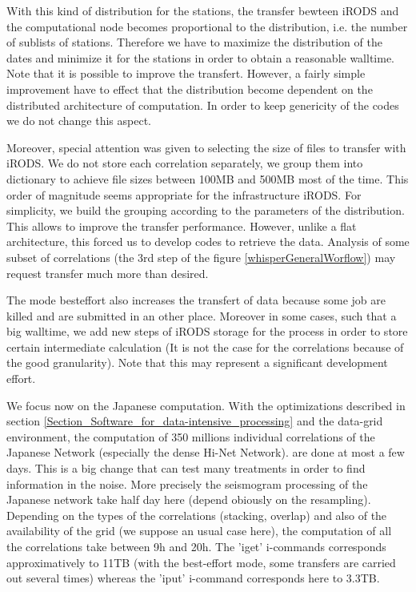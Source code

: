 \documentclass[a4paper, 10pt]{article}
\begin{document}
\begin{multicols}{2}
With this kind of distribution for the stations, the transfer bewteen iRODS and the computational node becomes proportional to 
the distribution, i.e. the number of sublists of stations. Therefore we have to maximize the distribution of the dates and minimize it
for the stations in order to obtain a reasonable walltime. Note that it is possible to improve the transfert.
However, a fairly simple improvement have to effect that the distribution become dependent on the distributed architecture of computation.
In order to keep genericity of the codes we do not change this aspect.

Moreover, special attention was given to selecting the size of files to transfer with iRODS.
We do not store each correlation separately, we group them into dictionary to achieve file sizes between 100MB and 500MB most of the time. 
This order of magnitude seems appropriate for the infrastructure iRODS.
For simplicity, we build the grouping according to the parameters of the distribution. This allows to improve the transfer performance.
However, unlike a flat architecture, this forced us to develop codes to retrieve the data. Analysis of some subset of correlations (the 3rd step of the figure \ref{whisperGeneralWorflow}) may request transfer much more than desired.


The mode besteffort also increases the transfert of data because some job are killed and are submitted in an other place.
Moreover in some cases, such that a big walltime, we add new steps of iRODS storage for the process in order to store certain intermediate calculation
(It is not the case for the correlations because of the good granularity). Note that this may represent a significant development effort.


We focus now on the Japanese computation. With the optimizations described in section \ref{Section_Software_for_data-intensive_processing} 
and the data-grid environment, the computation of 350 millions individual correlations of the Japanese Network (especially the dense Hi-Net Network). 
are done at most a few days. This is a big change that can test many treatments in order to find information in the noise.
More precisely the seismogram processing of the Japanese network take half day here (depend obiously on the resampling).
Depending on the types of the correlations (stacking, overlap) and also of the availability of the grid (we suppose an usual case here), 
the computation of all the correlations take between 9h and 20h. The 'iget' i-commands corresponds approximatively to 11TB (with the best-effort mode,
some transfers are carried out several times) whereas the 'iput' i-command corresponds here to 3.3TB. 



\end{multicols}
\end{document}
